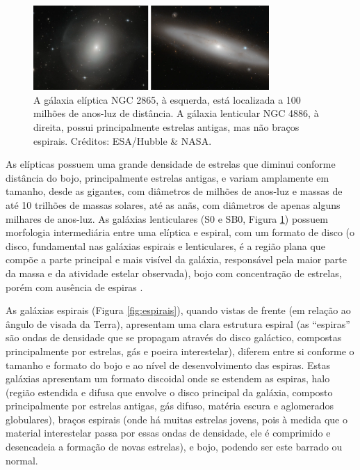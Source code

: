 \begin{figure}[h] 
  \centering 
  \includegraphics[width=0.8\textwidth]{Imagens/eliptica_lenticular.png} 
  \caption[Gálaxia elíptica NGC 2865 e gálaxia lenticular NGC 4886.]{A gálaxia elíptica NGC 2865, à esquerda, está localizada a 100 milhões de anos-luz de distância. A gálaxia lenticular NGC 4886, à direita, possui principalmente estrelas antigas, mas não braços espirais. Créditos: ESA/Hubble \& NASA.}
  \label{fig:eliptica_lenticular} 
\end{figure}

As elípticas possuem uma grande densidade de estrelas que diminui conforme distância do bojo, principalmente estrelas antigas, e variam amplamente em tamanho, desde as gigantes, com diâmetros de milhões de anos-luz e massas de até 10 trilhões de massas solares, até as anãs, com diâmetros de apenas alguns milhares de anos-luz. As galáxias lenticulares (S0 e SB0, Figura \ref{fig:eliptica_lenticular}) possuem morfologia intermediária entre uma elíptica e espiral, com um formato de disco (o disco, fundamental nas galáxias espirais e lenticulares, é a região plana que compõe a parte principal e mais visível da galáxia, responsável pela maior parte da massa e da atividade estelar observada), bojo com concentração de estrelas, porém com ausência de espiras \cite{2018sm,2022gastao,2023Kepler}.

As galáxias espirais (Figura \ref{fig:espirais}), quando vistas de frente (em relação ao ângulo de visada da Terra), apresentam uma clara estrutura espiral (as ``espiras'' são ondas de densidade que se propagam através do disco galáctico, compostas principalmente por estrelas, gás e poeira interestelar), diferem entre si conforme o tamanho e formato do bojo e ao nível de desenvolvimento das espiras. Estas galáxias apresentam um formato discoidal onde se estendem as espiras, halo (região estendida e difusa que envolve o disco principal da galáxia, composto principalmente por estrelas antigas, gás difuso, matéria escura e aglomerados globulares), braços espirais (onde há muitas estrelas jovens, pois à medida que o material interestelar passa por essas ondas de densidade, ele é comprimido e desencadeia a formação de novas estrelas), e bojo, podendo ser este barrado ou normal.

